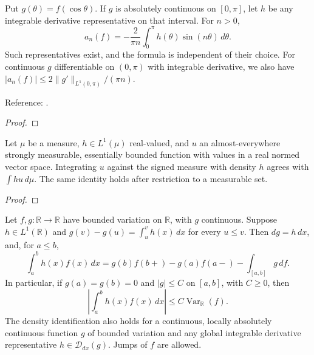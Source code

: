 \begin{supporting}

\begin{theorem}
\label{thm:cosine-integration-by-parts}
\leanok
Put $g(\theta)=f(\cos\theta)$. If $g$ is absolutely continuous on $[0,\pi]$,
let $h$ be any integrable derivative representative on that interval. For $n>0$,
\[a_n(f)=-\frac{2}{\pi n}\int_0^\pi h(\theta)\sin(n\theta)\,d\theta.\]
Such representatives exist, and the formula is independent of their choice.
For continuous $g$ differentiable on $(0,\pi)$ with integrable derivative,
we also have $|a_n(f)|\le 2\|g'\|_{L^1(0,\pi)}/(\pi n)$.

Reference: \cite[Chapter 7]{atap}.
\end{theorem}
\begin{proof}
\leanok
\end{proof}

\begin{theorem}
\label{thm:signed-density-integral}
\leanok
Let $\mu$ be a measure, $h\in L^1(\mu)$ real-valued, and $u$ an
almost-everywhere strongly measurable, essentially bounded function with
values in a real normed vector space. Integrating $u$ against the signed
measure with density $h$ agrees with $\int h u\,d\mu$. The same identity
holds after restriction to a measurable set.
\end{theorem}
\begin{proof}
\leanok
\end{proof}

\begin{theorem}
\label{thm:bv-integration-by-parts}
\leanok
Let $f,g:\mathbb R\to\mathbb R$ have bounded variation on $\mathbb R$,
with $g$ continuous. Suppose $h\in L^1(\mathbb R)$ and
$g(v)-g(u)=\int_u^v h(x)\,dx$ for every $u\le v$.
Then $dg=h\,dx$, and, for $a\le b$,
\[
\int_a^b h(x)f(x)\,dx
 =g(b)f(b+)-g(a)f(a-)-\int_{[a,b]}g\,df.
\]
In particular, if $g(a)=g(b)=0$ and $|g|\le C$ on $[a,b]$, with $C\ge0$,
then
\[
\left|\int_a^b h(x)f(x)\,dx\right|
 \le C\operatorname{Var}_{\mathbb R}(f).
\]
The density identification also holds for a continuous, locally absolutely
continuous function $g$ of bounded variation and any global integrable
derivative representative $h\in\mathcal D_{dx}(g)$. Jumps of $f$ are allowed.


\end{theorem}
\end{supporting}
